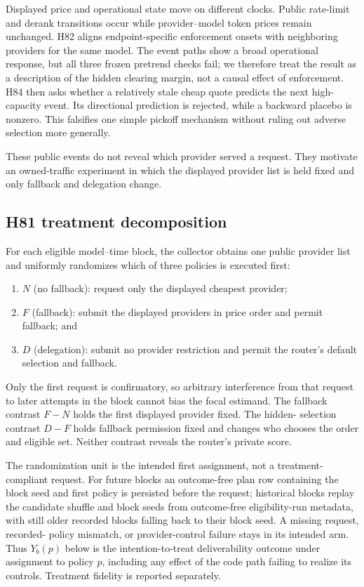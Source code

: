 \documentclass[11pt]{article}
\newcommand{\1}{\mathbf{1}}
\begin{document}
Displayed price and operational state move on different clocks.  Public
rate-limit and derank transitions occur while provider--model token prices remain
unchanged.  H82 aligns endpoint-specific enforcement onsets with neighboring
providers for the same model.  The event paths show a broad operational response,
but all three frozen pretrend checks fail; we therefore treat the result as a
description of the hidden clearing margin, not a causal effect of enforcement.
H84 then asks whether a relatively stale cheap quote predicts the next
high-capacity event.  Its directional prediction is rejected, while a backward
placebo is nonzero.  This falsifies one simple pickoff mechanism without ruling
out adverse selection more generally.

These public events do not reveal which provider served a request.  They motivate
an owned-traffic experiment in which the displayed provider list is held fixed
and only fallback and delegation change.

\subsection{H81 treatment decomposition}

For each eligible model--time block, the collector obtains one public provider
list and uniformly randomizes which of three policies is executed first:
\begin{enumerate}
  \item $N$ (no fallback): request only the displayed cheapest provider;
  \item $F$ (fallback): submit the displayed providers in price order and permit
  fallback; and
  \item $D$ (delegation): submit no provider restriction and permit the router's
  default selection and fallback.
\end{enumerate}
Only the first request is confirmatory, so arbitrary interference from that
request to later attempts in the block cannot bias the focal estimand.  The
fallback contrast $F-N$ holds the first displayed provider fixed.  The hidden-
selection contrast $D-F$ holds fallback permission fixed and changes who chooses
the order and eligible set.  Neither contrast reveals the router's private score.

The randomization unit is the intended first assignment, not a treatment-
compliant request.  For future blocks an outcome-free plan row containing the
block seed and first policy is persisted before the request; historical blocks
replay the candidate shuffle and block seeds from outcome-free eligibility-run
metadata, with still older recorded blocks falling back to their block seed.  A
missing request, recorded-
policy mismatch, or provider-control failure stays in its intended arm.  Thus
$Y_b(p)$ below is the intention-to-treat deliverability outcome under assignment
to policy $p$, including any effect of the code path failing to realize its
controls.  Treatment fidelity is reported separately.
\end{document}

